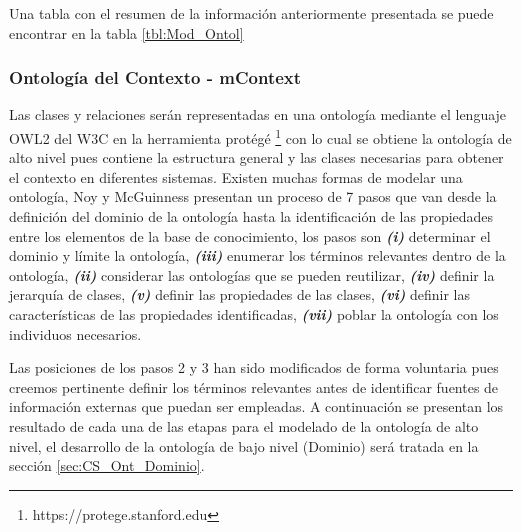 Una tabla con el resumen de la información anteriormente presentada se puede encontrar en la tabla \ref{tbl:Mod_Ontol}








\subsubsection{Ontología del Contexto - mContext}
\label{subsubsec:Prop_Mod_mContext}

Las clases y relaciones serán representadas en una ontología mediante el lenguaje OWL2 del W3C en la herramienta protégé \footnote{https://protege.stanford.edu} con lo cual se obtiene la ontología de alto nivel pues contiene la estructura general y las clases necesarias para obtener el contexto en diferentes sistemas. Existen muchas formas de modelar una ontología, Noy y McGuinness \cite{noy2001ontology} presentan un proceso de 7 pasos que van desde la definición del dominio de la ontología hasta la identificación de las propiedades entre los elementos de la base de conocimiento, los pasos son
\textbf{\textit{(i)}} determinar el dominio y límite la ontología, 
\textbf{\textit{(iii)}} enumerar los términos relevantes dentro de la ontología,
\textbf{\textit{(ii)}} considerar las ontologías que se pueden reutilizar,
\textbf{\textit{(iv)}} definir la jerarquía de clases,
\textbf{\textit{(v)}} definir las propiedades de las clases,
\textbf{\textit{(vi)}} definir las características de las propiedades identificadas,
\textbf{\textit{(vii)}} poblar la ontología con los individuos necesarios.

Las posiciones de los pasos 2 y 3 han sido modificados de forma voluntaria pues creemos pertinente definir los términos relevantes antes de identificar fuentes de información externas que puedan ser empleadas. A continuación se presentan los resultado de cada una de las etapas para el modelado de la ontología de alto nivel, el desarrollo de la ontología de bajo nivel (Dominio) será tratada en la sección \ref{sec:CS_Ont_Dominio}.

